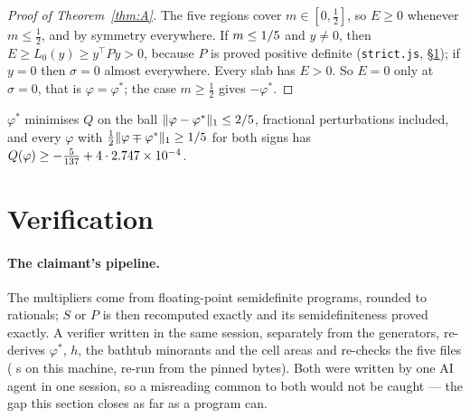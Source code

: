 \documentclass[11pt]{article}
\newcommand{\vphi}{\varphi}
\begin{document}
\begin{proof}[Proof of Theorem~\ref{thm:A}]
The five regions cover $m\in[0,\frac12]$, so $E\ge0$ whenever $m\le\frac12$, and by symmetry everywhere. If $m\le1/5$ and $y\neq0$, then $E\ge L_0(y)\ge y^\top Py>0$, because $P$ is proved positive definite (\texttt{strict.js}, \S\ref{sec:verif}); if $y=0$ then $\sigma=0$ almost everywhere. Every slab has $E>0$. So $E=0$ only at $\sigma=0$, that is $\vphi=\vphi^*$; the case $m\ge\frac12$ gives $-\vphi^*$.
\end{proof}

\begin{corollary}
$\vphi^*$ minimises $Q$ on the ball $\norm{\vphi-\vphi^*}_1\le\RinDouble$, fractional perturbations included, and every $\vphi$ with $\frac12\norm{\vphi\mp\vphi^*}_1\ge\Rin$ for both signs has $Q(\vphi)\ge-\frac5{137}+4\cdot\MinSlab$.
\end{corollary}

\section{Verification}\label{sec:verif}

\paragraph{The claimant's pipeline.} The multipliers come from floating-point semidefinite programs, rounded to rationals; $S$ or $P$ is then recomputed exactly and its semidefiniteness proved exactly. A verifier written in the same session, separately from the generators, re-derives $\vphi^*$, $h$, the bathtub minorants and the cell areas and re-checks the five files (\ClaimantSeconds{} s on this machine, re-run from the pinned bytes). Both were written by one AI agent in one session, so a misreading common to both would not be caught --- the gap this section closes as far as a program can.
\end{document}
